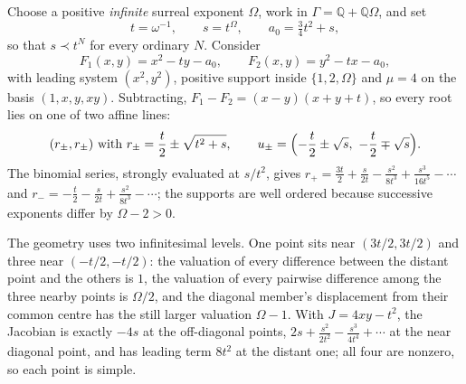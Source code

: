 \documentclass[11pt,letterpaper]{article}
\theoremstyle{definition}
\theoremstyle{remark}
\newcommand{\Q}{\mathbb Q}
\numberwithin{equation}{section}
\begin{document}
Choose a positive \emph{infinite} surreal exponent $\Omega$, work in $\Gamma=\Q+\Q\Omega$, and set
\[
 t=\omega^{-1},\qquad s=t^\Omega,\qquad a_0=\tfrac34t^2+s,
\]
so that $s\prec t^N$ for every ordinary $N$. Consider
\begin{equation}\label{finite:eq:tripleF}
 F_1(x,y)=x^2-ty-a_0,
 \qquad
 F_2(x,y)=y^2-tx-a_0 ,
\end{equation}
with leading system $(x^2,y^2)$, positive support inside $\{1,2,\Omega\}$ and $\mu=4$ on the basis $(1,x,y,xy)$. Subtracting, $F_1-F_2=(x-y)(x+y+t)$, so every root lies on one of two affine lines:
\begin{equation}\label{finite:eq:tripleroots}
 (r_\pm,r_\pm)\ \text{with}\ r_\pm=\frac t2\pm\sqrt{t^2+s},
 \qquad
 u_\pm=\Bigl(-\frac t2\pm\sqrt s,\ -\frac t2\mp\sqrt s\Bigr).
\end{equation}
The binomial series, strongly evaluated at $s/t^2$, gives $r_+=\tfrac{3t}2+\tfrac s{2t}-\tfrac{s^2}{8t^3}+\tfrac{s^3}{16t^5}-\cdots$ and $r_-=-\tfrac t2-\tfrac s{2t}+\tfrac{s^2}{8t^3}-\cdots$; the supports are well ordered because successive exponents differ by $\Omega-2>0$.

The geometry uses two infinitesimal levels. One point sits near $(3t/2,3t/2)$ and three near $(-t/2,-t/2)$: the valuation of every difference between the distant point and the others is $1$, the valuation of every pairwise difference among the three nearby points is $\Omega/2$, and the diagonal member's displacement from their common centre has the still larger valuation $\Omega-1$. With $J=4xy-t^2$, the Jacobian is exactly $-4s$ at the off-diagonal points, $2s+\tfrac{s^2}{2t^2}-\tfrac{s^3}{4t^4}+\cdots$ at the near diagonal point, and has leading term $8t^2$ at the distant one; all four are nonzero, so each point is simple.
\end{document}
